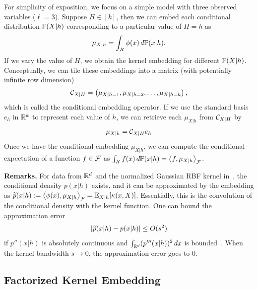 \documentclass{article}
\begin{document}
For simplicity of exposition, we focus on a simple model with three observed variables ($\ell=3$). Suppose $H\in[k]$, then we can embed each conditional distribution $\mathbb{P}(X|h)$ corresponding to a particular value of $H=h$ as
\begin{align}
  \mu_{X|h} = \int_{\mathcal{X}} \phi(x)\, d \mathbb{P}(x | h).
\end{align}
If we vary the value of $H$, we  obtain the kernel embedding for different $\mathbb{P}(X|h)$. Conceptually, we can tile these embeddings into a matrix (with potentially infinite row dimension)
\begin{align}
  \mathcal{C}_{X|H} = \left(\mu_{X|h=1},\mu_{X|h=2},\ldots,\mu_{X|h=k}\right),
\end{align}
which is called the conditional embedding operator. If we use the standard basis $e_h$ in $\mathbb{R}^k$ to represent each value of $h$, we can retrieve each $\mu_{X|h}$ from $\mathcal{C}_{X|H}$ by
\begin{align}
  \mu_{X|h} = \mathcal{C}_{X|H} e_h
\end{align}
Once we have the conditional embedding $\mu_{X|h}$, we can compute the conditional expectation of a function $f\in \mathcal{F}$ as $\int_{\mathcal{X}} f(x) \,d\mathbb{P}(x|h)  = \left\langle f,\mu_{X|h} \right\rangle_{\mathcal{F}}$.

{\bf Remarks.} For data from $\mathbb{R}^d$ and the normalized Gaussian RBF kernel in~, the conditional density $p(x|h)$ exists, and it can be approximated by the embedding as $\widetilde{p}(x|h) := \left\langle \phi(x),\mu_{X|h} \right\rangle_{\mathcal{F}}=\mathbb{E}_{X|h}[\kappa(x,X)]$. Essentially, this is the convolution of the conditional density with the kernel function. One can bound the approximation error
\begin{align}
	\left|\widetilde{p}(x|h)-p(x|h)\right| \leq O(s^2)
	\label{eq:kdebias}
\end{align}
if $p''(x|h)$ is absolutely continuous and $\int_{\mathbb{R}^d} (p'''(x|h))^2\,dx$ is bounded~\cite{Wasserman06}. When the kernel bandwidth $s \rightarrow 0$, the approximation error goes to 0.

\vspace{-3mm}
\subsection{Factorized Kernel Embedding}
\vspace{-2mm}
\end{document}
